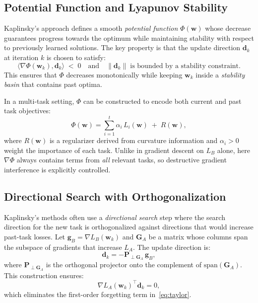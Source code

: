 \documentclass[12pt]{article}
\begin{document}
\subsection{Potential Function and Lyapunov Stability}
Kaplinsky’s approach defines a smooth \emph{potential function} $\Phi(\mathbf{w})$
whose decrease guarantees progress towards the optimum while maintaining stability
with respect to previously learned solutions. The key property is that the update
direction $\mathbf{d}_k$ at iteration $k$ is chosen to satisfy:
\begin{equation}
\langle \nabla \Phi(\mathbf{w}_k), \mathbf{d}_k \rangle \;<\; 0
\quad\text{and}\quad
\|\mathbf{d}_k\| \;\text{is bounded by a stability constraint}.
\label{eq:kaplinsky-dir}
\end{equation}
This ensures that $\Phi$ decreases monotonically while keeping $\mathbf{w}_k$ inside
a \emph{stability basin} that contains past optima.

In a multi-task setting, $\Phi$ can be constructed to encode both current and past
task objectives:
\begin{equation}
\Phi(\mathbf{w}) = \sum_{i=1}^t \alpha_i\, L_i(\mathbf{w}) \;+\; R(\mathbf{w}),
\end{equation}
where $R(\mathbf{w})$ is a regularizer derived from curvature information and
$\alpha_i>0$ weight the importance of each task.  
Unlike in gradient descent on $L_B$ alone, here $\nabla\Phi$ always contains terms
from \emph{all} relevant tasks, so destructive gradient interference is explicitly
controlled.

\subsection{Directional Search with Orthogonalization}
Kaplinsky's methods often use a \emph{directional search} step where the search
direction for the new task is orthogonalized against directions that would increase
past-task losses. Let $\mathbf{g}_B = \nabla L_B(\mathbf{w}_k)$ and
$\mathbf{G}_A$ be a matrix whose columns span the subspace of gradients that
increase $L_A$. The update direction is:
\begin{equation}
\mathbf{d}_k = -\mathbf{P}_{\perp \mathbf{G}_A} \, \mathbf{g}_B,
\end{equation}
where $\mathbf{P}_{\perp \mathbf{G}_A}$ is the orthogonal projector onto the
complement of $\mathrm{span}(\mathbf{G}_A)$.  
This construction ensures:
\begin{equation}
\nabla L_A(\mathbf{w}_k)^\top \mathbf{d}_k = 0,
\end{equation}
which eliminates the first-order forgetting term in~\eqref{eq:taylor}.
\end{document}
